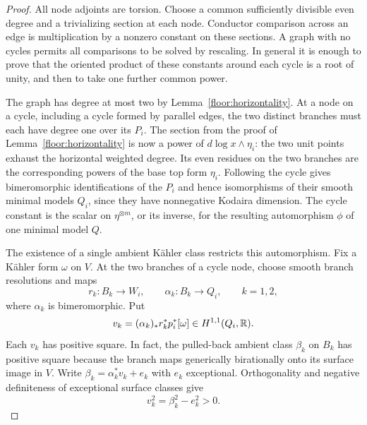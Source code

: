 \begin{proof}
All node adjoints are torsion.  Choose a common sufficiently
divisible even degree and a trivializing section at each
node.  Conductor comparison across an edge is multiplication
by a nonzero constant on these sections.  A graph with no
cycles permits all comparisons to be solved by rescaling.
In general it is enough to prove that the oriented product
of these constants around each cycle is a root of unity,
and then to take one further common power.

The graph has degree at most two by
Lemma~\ref{floor:horizontality}.  At a node on a cycle,
including a cycle formed by parallel edges, the two distinct
branches must each have degree one over its $P_i$.  The
section from the proof of Lemma~\ref{floor:horizontality}
is now a power of $d\log x\wedge\eta_i$: the two unit
points exhaust the horizontal weighted degree.  Its even
residues on the two branches are the corresponding powers
of the base top form $\eta_i$.  Following the cycle gives
bimeromorphic identifications of the $P_i$ and hence
isomorphisms of their smooth minimal models $Q_i$, since
they have nonnegative Kodaira dimension.  The cycle
constant is the scalar on $\eta^{\otimes m}$, or its
inverse, for the resulting automorphism $\phi$ of one
minimal model $Q$.

The existence of a single ambient K\"ahler class restricts
this automorphism.  Fix a K\"ahler form $\omega$ on $V$.
At the two branches of a cycle node, choose smooth branch
resolutions and maps
\[
 r_k:B_k\longrightarrow W_i,\qquad
 \alpha_k:B_k\longrightarrow Q_i,\qquad k=1,2,
\]
where $\alpha_k$ is bimeromorphic.  Put
\[
 v_k=(\alpha_k)_*r_k^*p_i^*[\omega]
       \in H^{1,1}(Q_i,\mathbb{R}).
\]
Each $v_k$ has positive square.  In fact, the pulled-back
ambient class $\beta_k$ on $B_k$ has positive square because
the branch maps generically birationally onto its surface
image in $V$.  Write
$\beta_k=\alpha_k^*v_k+e_k$ with $e_k$ exceptional.
Orthogonality and negative definiteness of exceptional
surface classes give
\begin{equation}
 \label{floor:positive-branch-class}
 v_k^2=\beta_k^2-e_k^2>0.
\end{equation}


\end{proof}
